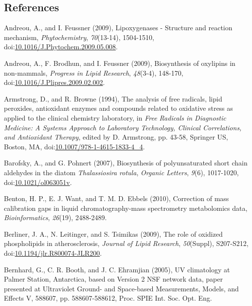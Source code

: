 \begin{singlespace}
\section*{References}
\addtocounter{section}{1}
{\setlength{\parindent}{0pt}
Andreou, A., and I. Feussner (2009), Lipoxygenases - Structure and reaction mechanism, \emph{Phytochemistry}, \emph{70}(13-14), 1504-1510, doi:\href{http://dx.doi.org/10.1016/J.Phytochem.2009.05.008}{10.1016/J.Phytochem.2009.05.008}.

{\setlength{\parskip}{10pt}

Andreou, A., F. Brodhun, and I. Feussner (2009), Biosynthesis of oxylipins in non-mammals, \emph{Progress in Lipid Research}, \emph{48}(3-4), 148-170, doi:\href{http://dx.doi.org/10.1016/J.Plipres.2009.02.002}{10.1016/J.Plipres.2009.02.002}.

Armstrong, D., and R. Browne (1994), The analysis of free radicals, lipid peroxides, antioxidant enzymes and compounds related to oxidative stress as applied to the clinical chemistry laboratory, in \emph{Free Radicals in Diagnostic Medicine: A Systems Approach to Laboratory Technology, Clinical Correlations, and Antioxidant Therapy}, edited by D. Armstrong, pp. 43-58, Springer US, Boston, MA, doi:\href{http://dx.doi.org/10.1007/978-1-4615-1833-4_4}{10.1007/978-1-4615-1833-4\_4}.

Barofsky, A., and G. Pohnert (2007), Biosynthesis of polyunsaturated short chain aldehydes in the diatom \emph{Thalassiosira rotula}, \emph{Organic Letters}, \emph{9}(6), 1017-1020, doi:\href{http://dx.doi.org/10.1021/ol063051v}{10.1021/ol063051v}.

Benton, H. P., E. J. Want, and T. M. D. Ebbels (2010), Correction of mass calibration gaps in liquid chromatography-mass spectrometry metabolomics data, \emph{Bioinformatics}, \emph{26}(19), 2488-2489.

Berliner, J. A., N. Leitinger, and S. Tsimikas (2009), The role of oxidized phospholipids in atherosclerosis, \emph{Journal of Lipid Research}, \emph{50}(Suppl), S207-S212, doi:\href{http://dx.doi.org/10.1194/jlr.R800074-JLR200}{10.1194/jlr.R800074-JLR200}.

Bernhard, G., C. R. Booth, and J. C. Ehramjian (2005), UV climatology at Palmer Station, Antarctica, based on Version 2 NSF network data, paper presented at Ultraviolet Ground- and Space-based Measurements, Models, and Effects V, 588607, pp. 588607-588612, Proc. SPIE Int. Soc. Opt. Eng.

}}
\end{singlespace}
